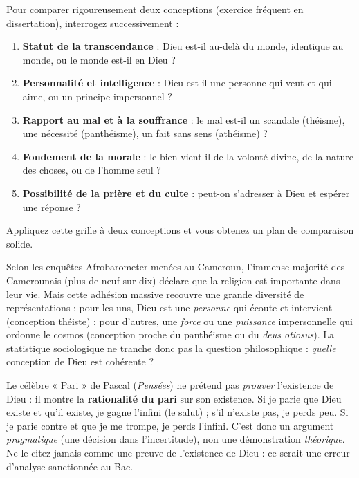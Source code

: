 \documentclass[11pt]{article}
\begin{document}
\begin{methode}
Pour comparer rigoureusement deux conceptions (exercice fréquent en dissertation), interrogez successivement :
\begin{enumerate}
\item \textbf{Statut de la transcendance} : Dieu est-il au-delà du monde, identique au monde, ou le monde est-il en Dieu ?
\item \textbf{Personnalité et intelligence} : Dieu est-il une personne qui veut et qui aime, ou un principe impersonnel ?
\item \textbf{Rapport au mal et à la souffrance} : le mal est-il un scandale (théisme), une nécessité (panthéisme), un fait sans sens (athéisme) ?
\item \textbf{Fondement de la morale} : le bien vient-il de la volonté divine, de la nature des choses, ou de l'homme seul ?
\item \textbf{Possibilité de la prière et du culte} : peut-on s'adresser à Dieu et espérer une réponse ?
\end{enumerate}
Appliquez cette grille à deux conceptions et vous obtenez un plan de comparaison solide.
\end{methode}

\begin{exemplebox}
Selon les enquêtes Afrobarometer menées au Cameroun, l'immense majorité des Camerounais (plus de neuf sur dix) déclare que la religion est importante dans leur vie. Mais cette adhésion massive recouvre une grande diversité de représentations : pour les uns, Dieu est une \emph{personne} qui écoute et intervient (conception théiste) ; pour d'autres, une \emph{force} ou une \emph{puissance} impersonnelle qui ordonne le cosmos (conception proche du panthéisme ou du \emph{deus otiosus}). La statistique sociologique ne tranche donc pas la question philosophique : \emph{quelle} conception de Dieu est cohérente ?
\end{exemplebox}

\begin{savaistu}
Le célèbre « Pari » de Pascal (\emph{Pensées}) ne prétend pas \emph{prouver} l'existence de Dieu : il montre la \textbf{rationalité du pari} sur son existence. Si je parie que Dieu existe et qu'il existe, je gagne l'infini (le salut) ; s'il n'existe pas, je perds peu. Si je parie contre et que je me trompe, je perds l'infini. C'est donc un argument \emph{pragmatique} (une décision dans l'incertitude), non une démonstration \emph{théorique}. Ne le citez jamais comme une preuve de l'existence de Dieu : ce serait une erreur d'analyse sanctionnée au Bac.
\end{savaistu}
\end{document}
